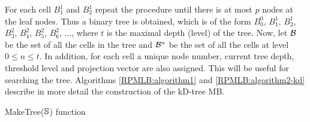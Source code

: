 \documentclass[11pt,final]{amsart}       %
\begin{document}
For each cell $B^{1}_{1}$ and $B^{1}_{2}$ repeat the procedure until
there is at most $p$ nodes at the leaf nodes. Thus a binary tree is
obtained, which is of the form $B^{0}_{0}$, $B^{1}_{1}$, $B^{1}_{2}$,
$B^{2}_{3}$, $B^{2}_{4}$, $B^{2}_{5}$, $B^{2}_{6}$, $\dots $, where
$t$ is the maximal depth (level) of the tree.  Now, let ${\mathcal B}$ be the
set of all the cells in the tree and ${\mathcal B}^{n}$ be the set of all the
cells at level $0 \leq n \leq t$.  In addition, for each cell a unique
node number, current tree depth, threshold level and projection vector
are also assigned. This will be useful for searching the tree.
Algorithms \ref{RPMLB:algorithm1} and \ref{RPMLB:algorithm2-kd}
describe in more detail the construction of the kD-tree MB.
 

\begin{algorithm}[h]
   

\caption{MakeTree($\mathbb{S}$) function}
\label{RPMLB:algorithm1}
\end{algorithm}


\end{document}
